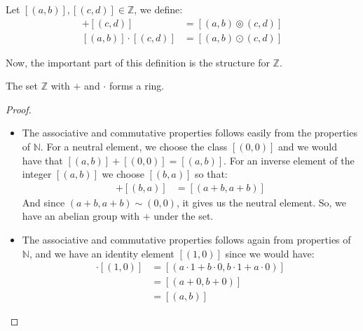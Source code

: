 \documentclass{tufte-handout}
\begin{document}
\begin{definition}
	Let $[(a, b)], [(c, d)] \in \mathbb{Z}$, we define:
	\begin{align*}
		[(a, b)] + [(c, d)] &= [(a, b) \circledcirc (c, d)]\\
		[(a, b)] \cdot [(c, d)] &= [(a, b) \odot (c, d)]
	\end{align*}
\end{definition}

Now, the important part of this definition is the structure for $\mathbb{Z}$.

\begin{theorem}
	The set $\mathbb{Z}$ with $+$ and $\cdot$ forms a ring.
\end{theorem}
\begin{proof}
	\begin{itemize}
		\item The associative and commutative properties follows easily from the properties of $\mathbb{N}$. For a neutral element, we choose the class $[(0, 0)]$ and we would have that $[(a, b)] + [(0, 0)] = [(a, b)]$. For an inverse element of the integer $[(a, b)]$ we choose $[(b, a)]$ so that:
		\begin{align*}
			[(a, b)] + [(b, a)] &= [(a + b, a + b)]
		\end{align*}
		And since $(a+b, a+b) \sim (0, 0)$, it gives us the neutral element. So, we have an abelian group with $+$ under the set.
		\item The associative and commutative properties follows again from properties of $\mathbb{N}$, and we have an identity element $[(1, 0)]$ since we would have:
		\begin{align*}
			[(a, b)] \cdot [(1, 0)] &= [(a\cdot 1 + b\cdot 0, b\cdot 1 + a \cdot 0)]\\
			&= [(a + 0, b + 0)]\\
			&= [(a, b)]
		\end{align*}
	\end{itemize}
\end{proof}
\end{document}
